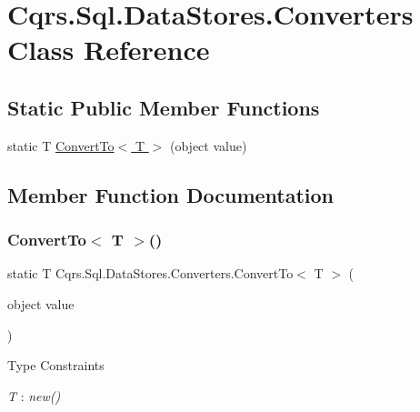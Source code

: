 \hypertarget{classCqrs_1_1Sql_1_1DataStores_1_1Converters}{}\section{Cqrs.\+Sql.\+Data\+Stores.\+Converters Class Reference}
\label{classCqrs_1_1Sql_1_1DataStores_1_1Converters}
\subsection*{Static Public Member Functions}
\begin{DoxyCompactItemize}
\item 
static T \hyperlink{classCqrs_1_1Sql_1_1DataStores_1_1Converters_a40b58c9a649e6c55ec973ab8fc4e1291_a40b58c9a649e6c55ec973ab8fc4e1291}{Convert\+To$<$ T $>$} (object value)
\end{DoxyCompactItemize}


\subsection{Member Function Documentation}
\mbox{\label{classCqrs_1_1Sql_1_1DataStores_1_1Converters_a40b58c9a649e6c55ec973ab8fc4e1291_a40b58c9a649e6c55ec973ab8fc4e1291}} 
\subsubsection{\texorpdfstring{Convert\+To$<$ T $>$()}{ConvertTo< T >()}}
{\footnotesize\ttfamily static T Cqrs.\+Sql.\+Data\+Stores.\+Converters.\+Convert\+To$<$ T $>$ (\begin{DoxyParamCaption}\item[{object}]{value }\end{DoxyParamCaption})\hspace{0.3cm}{\ttfamily [static]}}

\begin{Desc}
\item[Type Constraints]\begin{description}
\item[{\em T} : {\em new()}]\end{description}
\end{Desc}
